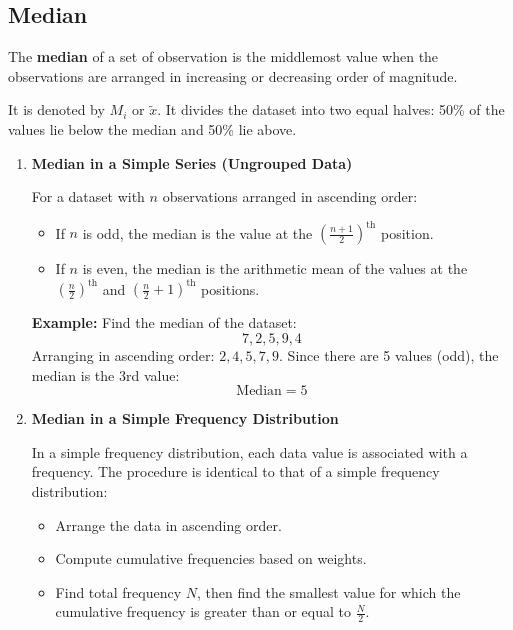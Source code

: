 \documentclass[twoside]{book}
\begin{document}
\subsection{Median}
\begin{textbox}
The \textbf{median} of a set of observation is the middlemost value when the observations are arranged in increasing or decreasing order of magnitude.
    \end{textbox}

It is denoted by $M_i$ or $\tilde{x}$. It divides the dataset into two equal halves: 50\% of the values lie below the median and 50\% lie above.


\begin{enumerate}

\item \textbf{Median in a Simple Series (Ungrouped Data)}

For a dataset with \( n \) observations arranged in ascending order:

\begin{itemize}
    \item If \( n \) is odd, the median is the value at the \( \left( \frac{n + 1}{2} \right)^\text{th} \) position.
    \item If \( n \) is even, the median is the arithmetic mean of the values at the \( \left( \frac{n}{2} \right)^\text{th} \) and \( \left( \frac{n}{2} + 1 \right)^\text{th} \) positions.
\end{itemize}

\textbf{Example:} Find the median of the dataset:
\[
7, 2, 5, 9, 4
\]
Arranging in ascending order: \( 2, 4, 5, 7, 9 \).
Since there are 5 values (odd), the median is the 3rd value:
\[
\text{Median} = 5
\]

\item \textbf{Median in a Simple Frequency Distribution}

In a simple frequency distribution, each data value is associated with a frequency. The procedure is identical to that of a simple frequency distribution:

\begin{itemize}
    \item Arrange the data in ascending order.
    \item Compute cumulative frequencies based on weights.
    \item Find total frequency \( N \), then find the smallest value for which the cumulative frequency is greater than or equal to \( \frac{N}{2} \).
\end{itemize}


\end{enumerate}
\end{document}
